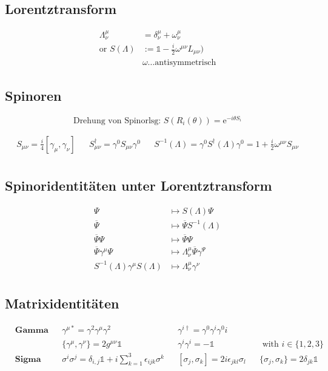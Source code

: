 \documentclass[10pt,a4paper,notitlepage]{scrartcl}
\begin{document}
\subsection*{Lorentztransform}

\begin{align*}
    \Lambda^\mu_\nu &= \delta^\mu_\nu + \omega^\mu_\nu\\
    \text{or } S(\Lambda) &:=  \mathbb{1} - \frac{i}{2} \omega^{\mu\nu}L_{\mu\nu})\\
    &\omega \ldots \text{antisymmetrisch}
\end{align*}

\subsection*{Spinoren}

\begin{equation}
    \text{Drehung von Spinorlsg:   } S(R_i(\theta)) = \text{e}^{-i\theta S_i}
\end{equation}

\begin{align*} 
    S_{\mu\nu} = \frac{i}{4}[\gamma_\mu, \gamma_\nu] &&
    S^\dagger_{\mu\nu} = \gamma^0 S_{\mu\nu}\gamma^0  &&
    S^{-1}(\Lambda)=\gamma^0 S^\dagger(\Lambda)\gamma^0 = 1 + \frac{i}{2}\omega^{\mu\nu} S_{\mu\nu}\\
\end{align*}

\subsection*{Spinoridentitäten unter Lorentztransform}
\begin{align*}
    \Psi &\mapsto S(\Lambda) \Psi\\
    \overline{\Psi} &\mapsto \overline{\Psi}S^{-1}(\Lambda)\\
    \overline{\Psi}\Psi &\mapsto \overline{\Psi}\Psi\\
    \overline{\Psi}\gamma^\mu\Psi &\mapsto \Lambda^\mu_\nu \overline{\Psi}\gamma^\Psi\\
    S^{-1}(\Lambda)\gamma^\mu S(\Lambda) &\mapsto \Lambda^\mu_\nu \gamma^\nu\\
\end{align*}

\subsection*{Matrixidentitäten}
\begin{align*}
    &\textbf{Gamma}&&\gamma^{\mu\ast} = \gamma^2\gamma^\mu\gamma^2 && \gamma^{i\dagger} = \gamma^0\gamma^i\gamma^0i \\
    &&&\{\gamma^\mu, \gamma^\nu\} = 2 g^{\mu\nu}\mathbb{1} &&\gamma^i\gamma^i = - \mathbb{1}
    &&\text{ with } i \in \{1,2,3\} \\    
    &\textbf{Sigma}&&\sigma^i\sigma^j = \delta_{i,j}\mathbb{1} + i \sum_{k=1}^3 \epsilon_{ijk}\sigma^k &&
    [\sigma_j, \sigma_k] = 2i\epsilon_{jkl}\sigma_l &&
    \{\sigma_j, \sigma_k\} = 2 \delta_{jk} \mathbb{1}\\
\end{align*}
\end{document}
